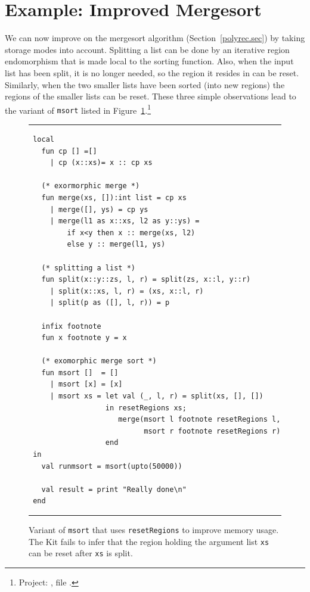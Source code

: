\documentclass[12pt]{book}
\begin{document}
\section{Example: Improved Mergesort}
\label{improvedmerge.sec}
We can now improve on the 
%
%
mergesort algorithm (Section~\ref{polyrec.sec}) by taking storage
modes into account. Splitting a list can be done by an iterative
region endomorphism that is made local to the sorting function.  Also,
when the input list has been split, it is no longer needed, so the
region it resides in can be reset. Similarly, when the two smaller
lists have been sorted (into new regions) the regions of the smaller
lists can be reset. These three simple observations lead to the
variant of {\tt msort} listed in
Figure~\ref{msortreset1.fig}.\footnote{Project:
  , file
  .}
\begin{figure}
\hrule
\medskip
\begin{verbatim}
 local
   fun cp [] =[]
     | cp (x::xs)= x :: cp xs

   (* exormorphic merge *)
   fun merge(xs, []):int list = cp xs
     | merge([], ys) = cp ys
     | merge(l1 as x::xs, l2 as y::ys) = 
         if x<y then x :: merge(xs, l2) 
         else y :: merge(l1, ys)

   (* splitting a list *)
   fun split(x::y::zs, l, r) = split(zs, x::l, y::r)
     | split(x::xs, l, r) = (xs, x::l, r)
     | split(p as ([], l, r)) = p

   infix footnote
   fun x footnote y = x

   (* exomorphic merge sort *)
   fun msort []  = []
     | msort [x] = [x]
     | msort xs = let val (_, l, r) = split(xs, [], [])
                  in resetRegions xs;
                     merge(msort l footnote resetRegions l, 
                           msort r footnote resetRegions r)
                  end
 in
   val runmsort = msort(upto(50000))

   val result = print "Really done\n"
 end
\end{verbatim}
\caption{Variant of {\tt msort} that uses {\tt resetRegions} to improve 
  memory usage. The Kit fails to infer that the region holding the
  argument list {\tt xs} can be reset after {\tt xs} is split.}
\label{msortreset1.fig}
\medskip \hrule
\end{figure}
\end{document}
